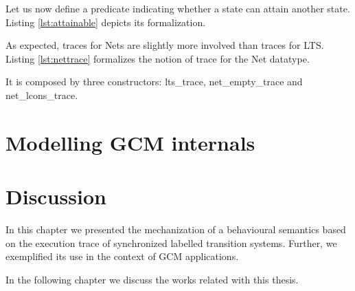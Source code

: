 				
	
	
	
		
	
	
	
	Let us now define a predicate indicating whether a state can attain another state. Listing \ref{lst:attainable}
	depicts its formalization.
			
				
	
		
	\noindent 
	
	
	
		As expected, traces for \textsf{Net}s are slightly more involved than traces for \textsc{LTS}. 
	Listing \ref{lst:nettrace} formalizes the notion of trace for the \textsf{Net} datatype.
			

			
	
	\noindent It is composed by three constructors: \textsf{lts\_trace},
	\textsf{net\_empty\_trace} and \textsf{net\_lcons\_trace}.
		
	
	


\section{Modelling GCM internals}
\label{sec:gcmpnets}



\section{Discussion}
\label{sec:behaviourdiscussion}


	


\chapbreak

	In this chapter we presented the mechanization of a behavioural 
semantics based on the execution trace of synchronized labelled transition systems. Further, we
exemplified its use in the context of \ac{GCM} applications.
	
	In the following chapter we discuss the works related with this thesis.



